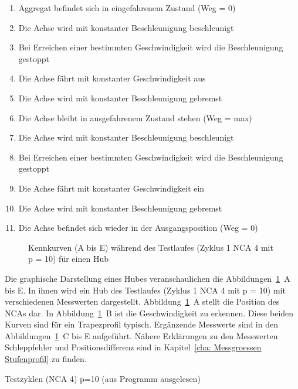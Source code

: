 \begin{enumerate}
 \item Aggregat befindet sich in eingefahrenem Zustand (Weg = 0)
 \item Die Achse wird mit konstanter Beschleunigung beschleunigt
 \item Bei Erreichen einer bestimmten Geschwindigkeit wird die Beschleunigung gestoppt
 \item Die Achse fährt mit konstanter Geschwindigkeit aus
 \item Die Achse wird mit konstanter Beschleunigung gebremst
 \item Die Achse bleibt in ausgefahrenem Zustand stehen (Weg = max)
 \item Die Achse wird mit konstanter Beschleunigung beschleunigt
 \item Bei Erreichen einer bestimmten Geschwindigkeit wird die Beschleunigung gestoppt
 \item Die Achse fährt mit konstanter Geschwindigkeit ein
 \item Die Achse wird mit konstanter Beschleunigung gebremst
 \item Die Achse befindet sich wieder in der Ausgangsposition (Weg = 0)
\end{enumerate}

\begin{figure}
\centering

\caption{Kennkurven (A bis E) während des Testlaufes (Zyklus 1 NCA 4 mit p = 10) für einen Hub}
\label{fig:Einlaufen_zyklus1_alles}
\end{figure}


Die graphische Darstellung eines Hubes veranschaulichen die Abbildungen~\ref{fig:Einlaufen_zyklus1_alles}~A bis E. In ihnen wird ein Hub des Testlaufes (Zyklus 1 NCA 4 mit p = 10) mit verschiedenen Messwerten dargestellt. Abbildung~\ref{fig:Einlaufen_zyklus1_alles}~A stellt die Position des NCAs dar. In Abbildung~\ref{fig:Einlaufen_zyklus1_alles}~B ist die Geschwindigkeit zu erkennen. Diese beiden Kurven sind für ein Trapezprofil typisch. Ergänzende Messwerte sind in den Abbildungen~\ref{fig:Einlaufen_zyklus1_alles}~C bis E aufgeführt. Nähere Erklärungen zu den Messwerten Schleppfehler und Positionsdifferenz sind in Kapitel~\ref{cha: Messgroessen Stufenprofil} zu finden. 


\begin{table}[ht]
\centering

\caption{Testzyklen (NCA 4) p=10 (aus Programm ausgelesen)}
\label{Einlauf_Zyklen}
\end{table}




